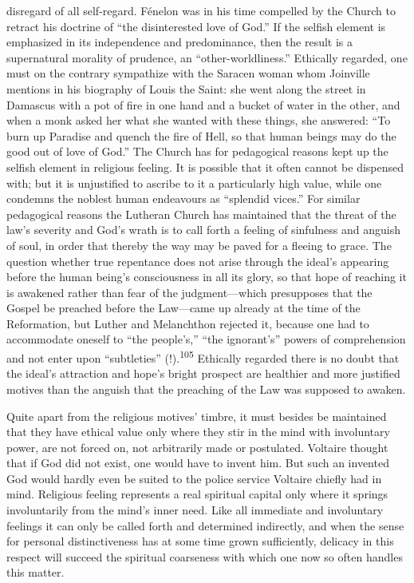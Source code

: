 \documentclass[12pt,a4paper]{book}
\newcommand{\opage}[1]{\marginnote{\footnotesize\textit{[#1]}}}
\begin{document}
disregard of all self-regard. Fénelon was in his time compelled by the Church to retract his doctrine of
``the disinterested love of God.'' If the selfish element is emphasized in its independence and
predominance, then the result is a supernatural morality of prudence, an ``other-worldliness.'' Ethically
regarded, one must on the contrary sympathize with the Saracen woman whom Joinville mentions in his
biography of Louis the Saint: she went along the street in Damascus with a pot of fire in one hand and a
bucket of water in the other, and when a monk asked her what she wanted with these things, she answered:
``To burn up Paradise and quench the fire of Hell, so that 
\opage{220}human beings may do the good out of love of
God.'' The Church has for pedagogical reasons kept up the selfish element in religious feeling. It is
possible that it often cannot be dispensed with; but it is unjustified to ascribe to it a particularly
high value, while one condemns the noblest human endeavours as ``splendid vices.'' For similar pedagogical
reasons the Lutheran Church has maintained that the threat of the law's severity and God's wrath is to
call forth a feeling of sinfulness and anguish of soul, in order that thereby the way may be paved for a
fleeing to grace. The question whether true repentance does not arise through the ideal's appearing before
the human being's consciousness in all its glory, so that hope of reaching it is awakened rather than fear
of the judgment---which presupposes that the Gospel be preached before the Law---came up already at the
time of the Reformation, but Luther and Melanchthon rejected it, because one had to accommodate oneself to
``the people's,'' ``the ignorant's'' powers of comprehension and not enter upon ``subtleties''
(!).\textsuperscript{105} Ethically regarded there is no doubt that the ideal's attraction and hope's
bright prospect are healthier and more justified motives than the anguish that the preaching of the Law was
supposed to awaken.

Quite apart from the religious motives' timbre, it must besides be maintained that they have ethical value
only where they stir in the mind with involuntary power, are not forced on, not arbitrarily made or
postulated. Voltaire thought that if God did not exist, one would have to invent him. But such an invented
God would hardly even be suited to the police service Voltaire chiefly had in mind. Religious feeling
represents a real spiritual capital only where it springs involuntarily from the mind's inner need. Like all
immediate and involuntary feelings it can only be called forth and determined indirectly, and when the sense
for personal distinctiveness has at some time grown sufficiently, delicacy in this respect will succeed the
spiritual coarseness with which one now so often handles this matter.
\end{document}
